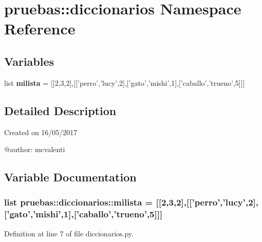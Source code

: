 \section{pruebas\-:\-:diccionarios \-Namespace \-Reference}
\label{namespacepruebas_1_1diccionarios}
\subsection*{\-Variables}
\begin{DoxyCompactItemize}
\item 
list {\bf milista} = [[2,3,2],[['perro','lucy',2],['gato','mishi',1],['caballo','trueno',5]]]
\end{DoxyCompactItemize}


\subsection{\-Detailed \-Description}
\begin{DoxyVerb}
Created on 16/05/2017

@author: mcvalenti
\end{DoxyVerb}
 

\subsection{\-Variable \-Documentation}
\subsubsection[{milista}]{\setlength{\rightskip}{0pt plus 5cm}list {\bf pruebas\-::diccionarios\-::milista} = [[2,3,2],[['perro','lucy',2],['gato','mishi',1],['caballo','trueno',5]]]}\label{namespacepruebas_1_1diccionarios_a2d87477326922bd02b5811f0ad4efa38}


\-Definition at line 7 of file diccionarios.\-py.

